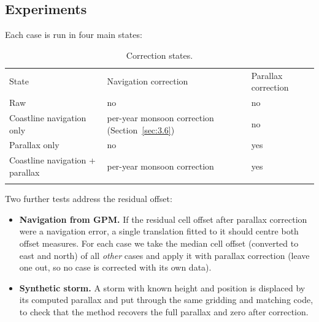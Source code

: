\subsection{Experiments}\label{sec:4.5}

Each case is run in four main states:

\begin{longtable}[]{@{}
  >{\raggedright\arraybackslash}p{}
  >{\raggedright\arraybackslash}p{}
  >{\raggedright\arraybackslash}p{}@{}}
\caption{Correction states.}\label{tab:S}\\
\toprule\noalign{}
\begin{minipage}[b]{\linewidth}\raggedright
State
\end{minipage} & \begin{minipage}[b]{\linewidth}\raggedright
Navigation correction
\end{minipage} & \begin{minipage}[b]{\linewidth}\raggedright
Parallax correction
\end{minipage} \\*
\midrule\noalign{}
\endfirsthead
\bottomrule\noalign{}
\endlastfoot
Raw & no & no \\*
Coastline navigation only & per-year monsoon correction (Section~\ref{sec:3.6}) & no \\*
Parallax only & no & yes \\*
Coastline navigation + parallax & per-year monsoon correction & yes \\*
\end{longtable}

Two further tests address the residual offset:

\begin{itemize}
\tightlist
\item
  \textbf{Navigation from GPM.} If the residual cell offset after parallax correction were a navigation error, a single translation fitted to it should centre both offset measures. For each case we take the median cell offset (converted to east and north) of all \emph{other} cases and apply it with parallax correction (leave one out, so no case is corrected with its own data).
\item
  \textbf{Synthetic storm.} A storm with known height and position is displaced by its computed parallax and put through the same gridding and matching code, to check that the method recovers the full parallax and zero after correction.
\end{itemize}

